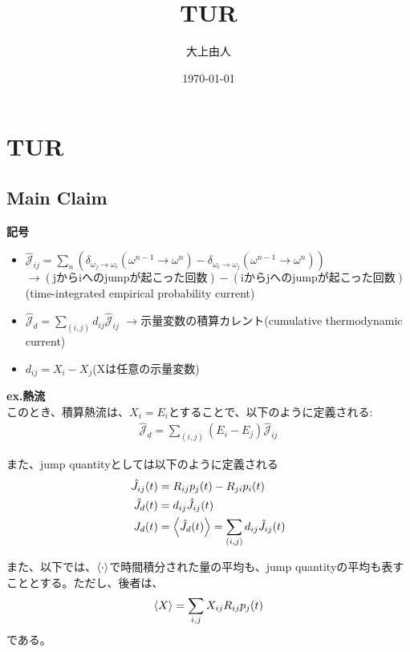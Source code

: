 \documentclass[a4paper,11pt]{jsarticle}
\numberwithin{equation}{section}
\begin{document}
\title{TUR}
\author{大上由人}
\date{\today}
\maketitle

\section{TUR}
\subsection{Main Claim}
\textbf{記号}
\begin{itemize}
    \item $\hat{\mathcal{J}}_{ij} = \sum_{n} (\delta_{\omega_j \to \omega_i}(\omega^{n-1}\to \omega^n) - \delta_{\omega_i \to \omega_j}(\omega^{n-1}\to \omega^n))$\\
$\to (\text{jからiへのjumpが起こった回数})-(\text{iからjへのjumpが起こった回数})$(time-integrated empirical probability current)\\
    \item $\hat{\mathcal{J}}_{d} = \sum_{(i,j)} d_{ij} \hat{\mathcal{J}}_{ij}$
$\to$示量変数の積算カレント(cumulative thermodynamic current)
    \item $d_{ij} = X_i - X_j$(Xは任意の示量変数)
\end{itemize}

\textbf{ex.熱流}\\
このとき、積算熱流は、$X_i = E_i$とすることで、以下のように定義される:
\begin{align}
    \hat{\mathcal{J}}_{d} = \sum_{(i,j)} (E_i - E_j) \hat{\mathcal{J}}_{ij}
\end{align}

また、jump quantityとしては以下のように定義される\\
\begin{align}
    \hat{J}_{ij}(t) &= R_{ij}p_j(t) - R_{ji}p_i(t)\\
    \hat{J}_{d}(t) &= d_{ij} \hat{J}_{ij}(t)\\
    J_{d}(t) &= \ev{\hat{J}_{d}(t)} = \sum_{(i,j)} d_{ij} \hat{J}_{ij}(t)
\end{align}

また、以下では、$\ev{\cdot}$で時間積分された量の平均も、jump quantityの平均も表すこととする。ただし、後者は、
\begin{align}
    \ev{X} = \sum_{i,j} X_{ij} R_{ij}p_j(t)
\end{align}
である。\\
\end{document}
